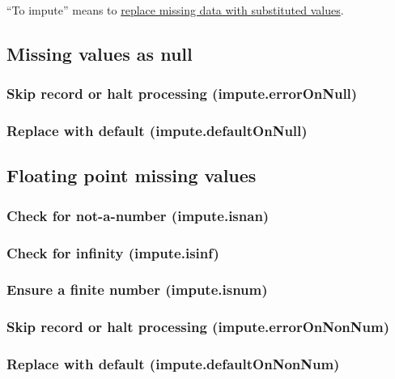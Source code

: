 \documentclass{article}
\theoremstyle{definition}
\begin{document}
``To impute'' means to \href{http://en.wikipedia.org/wiki/Imputation_(statistics)}{replace missing data with substituted values}.

\subsection{Missing values as null}

\subsubsection{Skip record or halt processing (impute.errorOnNull)}

\subsubsection{Replace with default (impute.defaultOnNull)}

\subsection{Floating point missing values}

\subsubsection{Check for not-a-number (impute.isnan)}

\subsubsection{Check for infinity (impute.isinf)}

\subsubsection{Ensure a finite number (impute.isnum)}

\subsubsection{Skip record or halt processing (impute.errorOnNonNum)}

\subsubsection{Replace with default (impute.defaultOnNonNum)}
\end{document}
